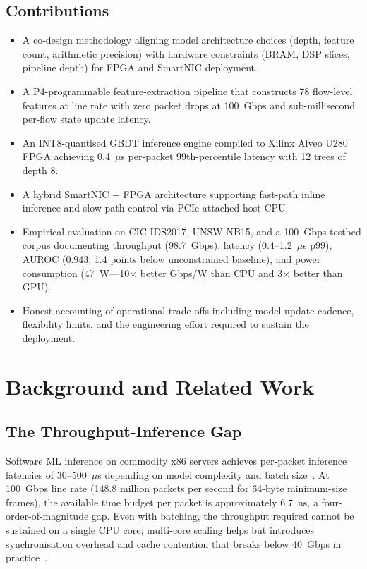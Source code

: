 \documentclass[sigconf,nonacm]{acmart}
\begin{document}
\subsection{Contributions}

\begin{itemize}
  \item A co-design methodology aligning model architecture choices
        (depth, feature count, arithmetic precision) with hardware
        constraints (BRAM, DSP slices, pipeline depth) for FPGA and
        SmartNIC deployment.
  \item A P4-programmable feature-extraction pipeline that constructs 78
        flow-level features at line rate with zero packet drops at
        100~Gbps and sub-millisecond per-flow state update latency.
  \item An INT8-quantised GBDT inference engine compiled to Xilinx Alveo
        U280 FPGA achieving 0.4~$\mu$s per-packet 99th-percentile latency
        with 12 trees of depth 8.
  \item A hybrid SmartNIC + FPGA architecture supporting fast-path
        inline inference and slow-path control via PCIe-attached host
        CPU.
  \item Empirical evaluation on CIC-IDS2017, UNSW-NB15, and a 100~Gbps
        testbed corpus documenting throughput (98.7~Gbps), latency
        (0.4--1.2~$\mu$s p99), AUROC (0.943, 1.4 points below
        unconstrained baseline), and power consumption (47~W---10$\times$
        better Gbps/W than CPU and 3$\times$ better than GPU).
  \item Honest accounting of operational trade-offs including model
        update cadence, flexibility limits, and the engineering effort
        required to sustain the deployment.
\end{itemize}

\section{Background and Related Work}

\subsection{The Throughput-Inference Gap}

Software ML inference on commodity x86 servers achieves per-packet
inference latencies of 30--500~$\mu$s depending on model complexity and
batch size~\cite{tensorflow,onnx}. At 100~Gbps line rate (148.8 million
packets per second for 64-byte minimum-size frames), the available time
budget per packet is approximately 6.7~ns, a four-order-of-magnitude
gap. Even with batching, the throughput required cannot be sustained
on a single CPU core; multi-core scaling helps but introduces
synchronisation overhead and cache contention that breaks below
40~Gbps in practice~\cite{lai2024ngids,zhao2025nidsurv}.
\end{document}
